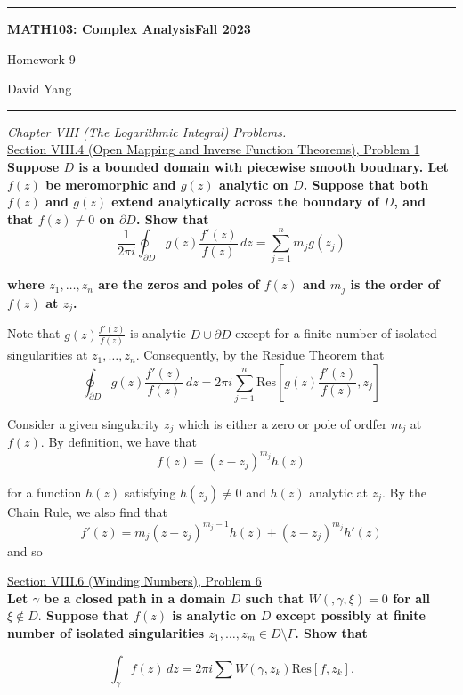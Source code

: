 \documentclass[11pt]{article}
\theoremstyle{definition}
\begin{document}
	\hrule
	\begin{center}
        \textbf{MATH103: Complex Analysis}\hfill \textbf{Fall 2023}\newline


		{\Large Homework 9}

		David Yang
	\end{center}

\hrule

\vspace{1em}


\textit{Chapter VIII (The Logarithmic Integral) Problems.} \\

\underline{Section VIII.4 (Open Mapping and Inverse Function Theorems), Problem 1}\\

\textbf{Suppose $D$ is a bounded domain with piecewise smooth boudnary. Let $f(z)$ be meromorphic and $g(z)$ analytic on $D$. Suppose that both $f(z)$ and $g(z)$ extend analytically
across the boundary of $D$, and that $f(z) \neq 0$ on $\partial D$. Show that}
\[ \frac{1}{2\pi i} \oint_{\partial D} g(z) \frac{f'(z)}{f(z)} \, dz = \sum \limits_{j=1}^n m_j g(z_j) \]

\textbf{where $z_1, \dots, z_n$ are the zeros and poles of $f(z)$ and $m_j$ is the order of $f(z)$ at $z_j$.}

Note that $g(z) \frac{f'(z)}{f(z)}$ is analytic $D \cup \partial D$ except for a finite number of isolated singularities at $z_1, \dots, z_n$. Consequently, by the Residue Theorem that
\[ \oint_{\partial D} g(z) \frac{f'(z)}{f(z)} \, dz = 2\pi i \sum\limits_{j=1}^n \mathrm{Res}\left[g(z) \frac{f'(z)}{f(z)}, z_j\right]\]

Consider a given singularity $z_j$ which is either a zero or pole of ordfer $m_j$ at $f(z)$. By definition, we have that
\[ f(z) = (z-z_j)^{m_j}h(z)\]

for a function $h(z)$ satisfying $h(z_j) \neq 0$ and $h(z)$ analytic at $z_j$. By the Chain Rule, we also find that \[ f'(z) = m_j (z-z_j)^{m_j - 1} h(z) + (z-z_j)^{m_j} h'(z)\] and so 
\newpage

\underline{Section VIII.6 (Winding Numbers), Problem 6}\\

\textbf{Let $\gamma$ be a closed path in a domain $D$ such that $W(, \gamma, \xi) = 0$ for all $\xi \notin D.$ 
Suppose that $f(z)$ is analytic on $D$ except possibly at finite number of isolated singularities $z_1, \dots, z_m \in D \setminus \Gamma$. Show that}

\[ \int_{\gamma} f(z) \, dz = 2\pi i \sum W(\gamma, z_k) \mathrm{Res}[f, z_k]. \]
\end{document}
